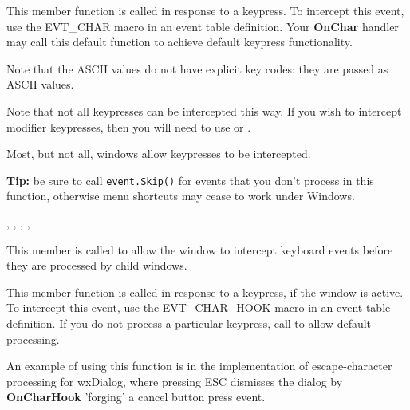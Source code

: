


This member function is called in response to a keypress. To intercept this event,
use the EVT\_CHAR macro in an event table definition. Your {\bf OnChar} handler may call this
default function to achieve default keypress functionality.

Note that the ASCII values do not have explicit key codes: they are passed as ASCII
values.

Note that not all keypresses can be intercepted this way. If you wish to intercept modifier
keypresses, then you will need to use  or
.

Most, but not all, windows allow keypresses to be intercepted.

{\bf Tip:} be sure to call {\tt event.Skip()} for events that you don't process in this function,
otherwise menu shortcuts may cease to work under Windows.


, ,\rtfsp
{}, ,\rtfsp
{}

\label{wxwindowoncharhook}


This member is called to allow the window to intercept keyboard events
before they are processed by child windows.




This member function is called in response to a keypress, if the window is active. To intercept this event,
use the EVT\_CHAR\_HOOK macro in an event table definition. If you do not process a particular
keypress, call  to allow default processing.

An example of using this function is in the implementation of escape-character processing for wxDialog,
where pressing ESC dismisses the dialog by {\bf OnCharHook} 'forging' a cancel button press event.

